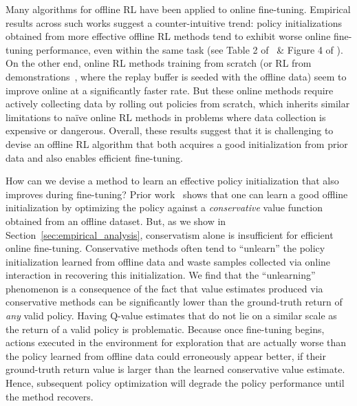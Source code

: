 Many algorithms for offline RL have been applied to online fine-tuning. Empirical results across such works suggest a counter-intuitive trend: policy initializations obtained from more effective offline RL methods tend to exhibit worse online fine-tuning performance, even within the same task (see Table 2 of~\cite{kostrikov2021offline} \& Figure 4 of \cite{xiao2023the}). On the other end, online RL methods training from scratch (or RL from demonstrations~\cite{vecerik2017leveraging},
where the replay buffer is seeded with the offline data) seem to improve online at a significantly faster rate. But these online methods require actively collecting data by rolling out policies from scratch, which inherits similar limitations to na\"ive online RL methods in problems where data collection is expensive or dangerous. Overall, these results suggest that it is challenging to devise an offline RL algorithm that both acquires a good initialization from prior data and also enables efficient fine-tuning.

How can we devise a method to learn an effective policy initialization that also improves during fine-tuning? Prior work~\cite{kumar2020conservative,cheng2022adversarially} shows that one can learn a good offline initialization by optimizing the policy against a \emph{conservative} value function obtained from an offline dataset. But, as we show in Section~\ref{sec:empirical_analysis}, conservatism alone is insufficient for efficient online fine-tuning. Conservative methods often tend to ``unlearn'' the policy initialization learned from offline data and waste samples collected via online interaction in recovering this initialization. We find that the ``unlearning'' phenomenon is a consequence of the fact that value estimates produced via conservative methods can be significantly lower than the ground-truth return of \emph{any} valid policy. Having Q-value estimates that do not lie on a similar scale as the return of a valid policy is problematic. Because once fine-tuning begins, actions executed in the environment for exploration that are actually worse than the policy learned from offline data could erroneously appear better, if their ground-truth return value is larger than the learned conservative value estimate. Hence, subsequent policy optimization will degrade the policy performance until the method recovers.  


